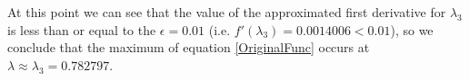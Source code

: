 \documentclass[11pt]{article}
\begin{document}
\begin{sol}
At this point we can see that the value of the approximated first derivative for $\lambda_3$ is less than or equal to the $\epsilon = 0.01$ (i.e. $f'(\lambda_3) = 0.0014006 < 0.01$), so we conclude that the maximum of equation \ref{OriginalFunc} occurs at $\lambda \approx \lambda_{3} = 0.782797$.

\end{sol}
\end{document}
